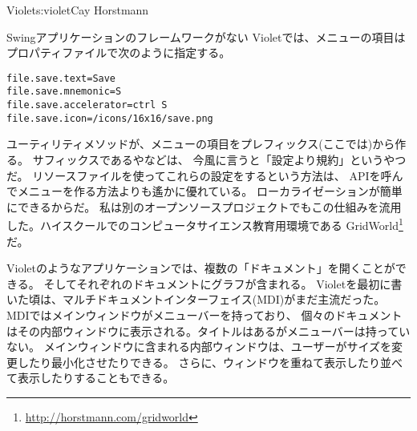 \begin{aosachapter}{Violet}{s:violet}{Cay Horstmann}
\begin{aosasect1}{Swingアプリケーションのフレームワークがない}
Violetでは、メニューの項目はプロパティファイルで次のように指定する。

\begin{verbatim}
file.save.text=Save
file.save.mnemonic=S
file.save.accelerator=ctrl S
file.save.icon=/icons/16x16/save.png
\end{verbatim}

\noindent
ユーティリティメソッドが、メニューの項目をプレフィックス(ここでは)から作る。
サフィックスであるやなどは、
今風に言うと「設定より規約」というやつだ。
リソースファイルを使ってこれらの設定をするという方法は、
APIを呼んでメニューを作る方法よりも遙かに優れている。
ローカライゼーションが簡単にできるからだ。
私は別のオープンソースプロジェクトでもこの仕組みを流用した。ハイスクールでのコンピュータサイエンス教育用環境である
GridWorld\footnote{\url{http://horstmann.com/gridworld}}だ。

Violetのようなアプリケーションでは、複数の「ドキュメント」を開くことができる。
そしてそれぞれのドキュメントにグラフが含まれる。
Violetを最初に書いた頃は、マルチドキュメントインターフェイス(MDI)がまだ主流だった。
MDIではメインウィンドウがメニューバーを持っており、
個々のドキュメントはその内部ウィンドウに表示される。タイトルはあるがメニューバーは持っていない。
メインウィンドウに含まれる内部ウィンドウは、ユーザーがサイズを変更したり最小化させたりできる。
さらに、ウィンドウを重ねて表示したり並べて表示したりすることもできる。


\end{aosasect1}
\end{aosachapter}
